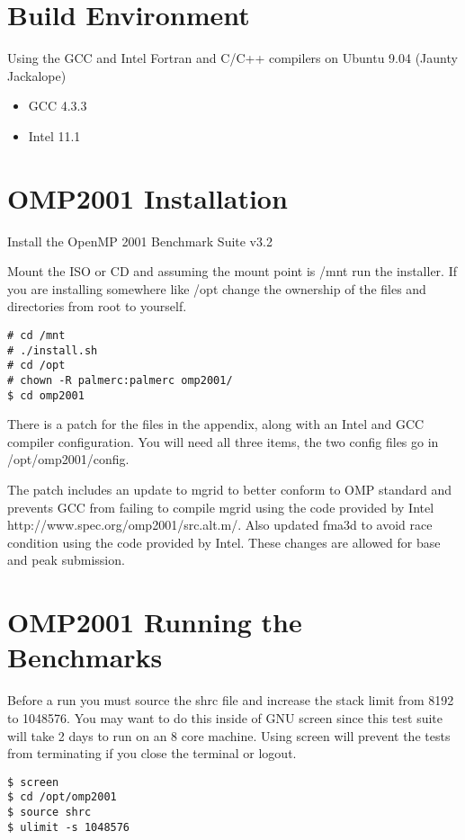 \documentclass[12pt,twoside,a4paper]{article}
\begin{document}
\section{Build Environment}
Using the GCC and Intel Fortran and C/C++ compilers on Ubuntu 9.04 (Jaunty Jackalope)

\begin{itemize}
\item GCC 4.3.3
\item Intel 11.1
\end{itemize}

\section{OMP2001 Installation}

Install the OpenMP 2001 Benchmark Suite v3.2

Mount the ISO or CD and assuming the mount point is /mnt run the installer. If you are installing somewhere like /opt change the ownership of the files and directories from root to yourself.

\begin{verbatim}
# cd /mnt
# ./install.sh
# cd /opt
# chown -R palmerc:palmerc omp2001/
$ cd omp2001
\end{verbatim}

There is a patch for the files in the appendix, along with an Intel and GCC compiler configuration. You will need all three items, the two config files go in /opt/omp2001/config.

The patch includes an update to mgrid to better conform to OMP standard and prevents GCC from failing to compile mgrid using the code provided by Intel http://www.spec.org/omp2001/src.alt.m/. Also updated fma3d to avoid race condition using the code provided by Intel. These changes are allowed for base and peak submission.

\section{OMP2001 Running the Benchmarks}

Before a run you must source the shrc file and increase the stack limit from 8192 to 1048576. You may want to do this inside of GNU screen since this test suite will
take 2 days to run on an 8 core machine. Using screen will prevent the tests from terminating if you close the terminal or logout.
\begin{verbatim}
$ screen
$ cd /opt/omp2001
$ source shrc
$ ulimit -s 1048576
\end{verbatim}
\end{document}
